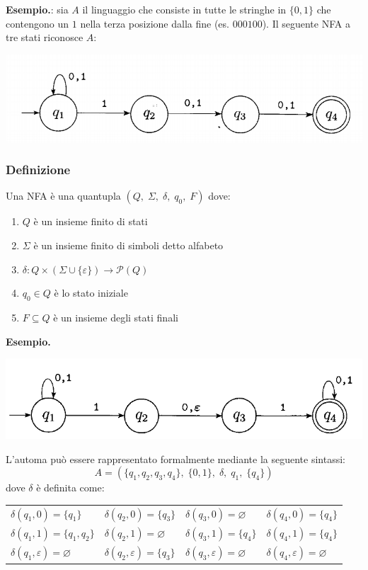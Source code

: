 \documentclass[italian]{article}
\newcommand{\powerset}[1]{\mathcal{P}(#1)}
\newcommand{\example}{\noindent\textbf{Esempio.\quad}}
\begin{document}
\example: sia $A$ il linguaggio che consiste in tutte le stringhe in $\{0,1\}$ che contengono un $1$ nella terza posizione dalla fine (es. $000100$). Il seguente NFA a tre stati riconosce $A$:
\begin{center}
	\includegraphics[width=0.5\linewidth]{images/nfa_1}
\end{center}
\pagebreak
\subsubsection{Definizione}
Una NFA è una quantupla $(Q,\;\Sigma,\;\delta,\;q_0,\;F)$ dove:
\begin{enumerate}
	\item $Q$ è un insieme finito di stati
	\item $\Sigma$ è un insieme finito di simboli detto alfabeto
	\item $\delta: Q\times (\Sigma \cup \{\varepsilon\}) \to \powerset{Q}$ 
	\item $q_0 \in Q$ è lo stato iniziale 
	\item $F \subseteq Q$ è un insieme degli stati finali 
\end{enumerate}
\example
\begin{center}
	\includegraphics[width=0.7\linewidth]{images/nfa_2}
\end{center}
L'automa può essere rappresentato formalmente mediante la seguente sintassi:
\[
	A = (\{q_1,q_2,q_3,q_4\},\; \{0,1\},\; \delta,\; q_1,\; \{q_4\}) 
\]
dove $\delta$ è definita come:
\begin{table}[h!]
	\begin{tabular}{@{}llll}
			$\delta(q_1,0) = \{q_1\}$ & $\delta(q_2,0) = \{q_3\}$ & $\delta(q_3,0) = \varnothing$ & $\delta(q_4,0) = \{q_4\}$\\
			$\delta(q_1,1) = \{q_1,q_2\}$ & $\delta(q_2,1) = \varnothing$ & $\delta(q_3,1) = \{q_4\}$ & $\delta(q_4,1) = \{q_4\}$\\
			$\delta(q_1,\varepsilon) = \varnothing$ & $\delta(q_2,\varepsilon) = \{q_3\}$ & $\delta(q_3,\varepsilon) = \varnothing$ & $\delta(q_4,\varepsilon) = \varnothing$
	\end{tabular}
\end{table}
\end{document}
